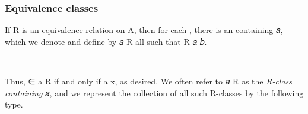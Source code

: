 \subsubsection{Equivalence classes}\label{equivalence-classes-1}

If \ab R is an equivalence relation on \ab A, then for each , there is an  containing \ab 𝑎, which we denote and define by \af{[} \ab 𝑎 \af{]} \ab R \as{:=} all  such that \ab R \ab 𝑎 \ab 𝑏.
\ccpad
\begin{code}%
\>[1]\AgdaOperator{\AgdaFunction{[\AgdaUnderscore{}]\AgdaUnderscore{}}}\AgdaSpace{}%
\AgdaSymbol{:}\AgdaSpace{}%
\AgdaSpace{}%
\AgdaSpace{}%
\AgdaSpace{}%
\AgdaSpace{}%
\AgdaSpace{}%
\AgdaSpace{}%
\AgdaSpace{}%
\AgdaSpace{}%
\<%
\\
%
\>[1]\AgdaOperator{\AgdaFunction{[}}\AgdaSpace{}%
\AgdaSpace{}%
\AgdaOperator{\AgdaFunction{]}}\AgdaSpace{}%
\AgdaSpace{}%
\AgdaSymbol{=}\AgdaSpace{}%
\AgdaSpace{}%
\AgdaSpace{}%
\AgdaSpace{}%
\AgdaSpace{}%
\AgdaSpace{}%
\<%
\end{code}
\ccpad
Thus,  \af ∈ \as{[} \ab a \as{]} \ab R if and only if  \ab a \ab x, as desired. We often refer to \af{[} \ab 𝑎 \af{]} \ab R as the \emph{R-class containing} \ab 𝑎, and we represent the collection of all such \ab R-classes by the following type.
\ccpad
